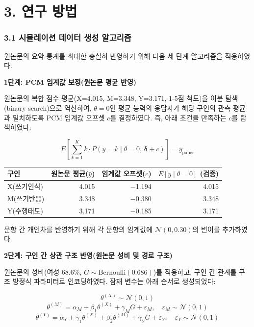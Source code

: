 \documentclass[a4paper,10pt]{oblivoir}
\begin{document}
\section{3. 연구 방법}

\subsubsection{3.1 시뮬레이션 데이터 생성 알고리즘}

원논문의 요약 통계를 최대한 충실히 반영하기 위해 다음 세 단계 알고리즘을 적용하였다.


\noindent\textbf{1단계: PCM 임계값 보정(원논문 평균 반영)}


원논문의 복합 점수 평균(X=4.015, M=3.348, Y=3.171, 1-5점 척도)을 이분 탐색(binary search)으로 역산하여, $\theta=0$인 평균 능력의 응답자가 해당 구인의 관측 평균과 일치하도록 PCM 임계값 오프셋 $c$를 결정하였다. 즉, 아래 조건을 만족하는 $c$를 탐색하였다:

\[ E\left[\sum_{k=1}^{K} k \cdot P(y=k \mid \theta=0,\, \boldsymbol{\delta}+c)\right] = \bar{y}_{\text{paper}} \]

\begin{table}[htbp]
\centering
\small
\begin{tabular}{lrrr}
\toprule
구인 & 원논문 평균($\bar{y}$) & 임계값 오프셋($c$) & $E[y \mid \theta=0]$ (검증) \\
\midrule
X(쓰기인식) & 4.015 & \ensuremath{-}1.194 & 4.015 \\
M(쓰기반응) & 3.348 & \ensuremath{-}0.380 & 3.348 \\
Y(수행태도) & 3.171 & \ensuremath{-}0.185 & 3.171 \\
\bottomrule
\end{tabular}
\end{table}

문항 간 개인차를 반영하기 위해 각 문항의 임계값에 $\mathcal{N}(0, 0.30)$의 변이를 추가하였다.


\noindent\textbf{2단계: 구인 간 상관 구조 반영(원논문 성비 및 경로 구조)}


원논문의 성비(여성 68.6\%, $G \sim \text{Bernoulli}(0.686)$)를 적용하고, 구인 간 관계를 구조 방정식 파라미터로 인코딩하였다. 잠재 변수는 아래 순서로 생성되었다:

\[ \theta^{(X)} \sim \mathcal{N}(0, 1) \]
\[ \theta^{(M)} = \alpha_M + \beta_1 \theta^{(X)} + \gamma_M G + \varepsilon_M, \quad \varepsilon_M \sim \mathcal{N}(0, 1) \]
\[ \theta^{(Y)} = \alpha_Y + \gamma_1 \theta^{(X)} + \beta_2 \theta^{(M)} + \gamma_Y G + \varepsilon_Y, \quad \varepsilon_Y \sim \mathcal{N}(0, 1) \]
\end{document}
